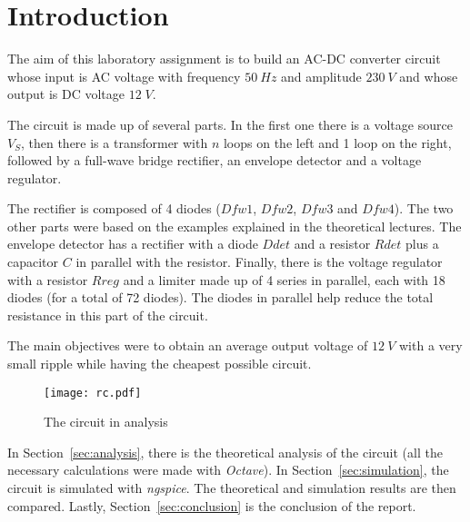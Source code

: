 \section{Introduction}
\label {sec:introduction}


The aim of this laboratory assignment is to build an AC-DC converter circuit whose input is AC voltage with frequency $50 \ Hz$ and amplitude $230 \ V$ and whose output is DC voltage $12 \; V$.


The circuit is made up of several parts. In the first one there is a voltage source $V_S$, then there is a transformer with $n$ loops on the left and 1 loop on the right, followed by a full-wave bridge rectifier, an envelope detector and a voltage regulator.

The rectifier is composed of 4 diodes ($Dfw1$, $Dfw2$, $Dfw3$ and $Dfw4$). The two other parts were based on the examples explained in the theoretical lectures. The envelope detector has a rectifier with a diode $Ddet$ and a resistor $Rdet$ plus a capacitor $C$ in parallel with the resistor. Finally, there is the voltage regulator with a resistor $Rreg$ and a limiter made up of 4 series in parallel, each with 18 diodes (for a total of 72 diodes). The diodes in parallel help reduce the total resistance in this part of the circuit.


The main objectives were to obtain an average output voltage of $12 \ V$ with a very small ripple while having the cheapest possible circuit.

\begin{figure}[H] \centering
\texttt{[image: rc.pdf]}
\caption{The circuit in analysis}
\label{fig:circuit}
\end{figure}


In Section~\ref{sec:analysis}, there is the theoretical analysis of the circuit (all the necessary calculations were made with \textit{Octave}). In Section~\ref{sec:simulation}, the circuit is simulated with \textit{ngspice}. The theoretical and simulation results are then compared. Lastly,  Section~\ref{sec:conclusion} is the conclusion of the report. 
